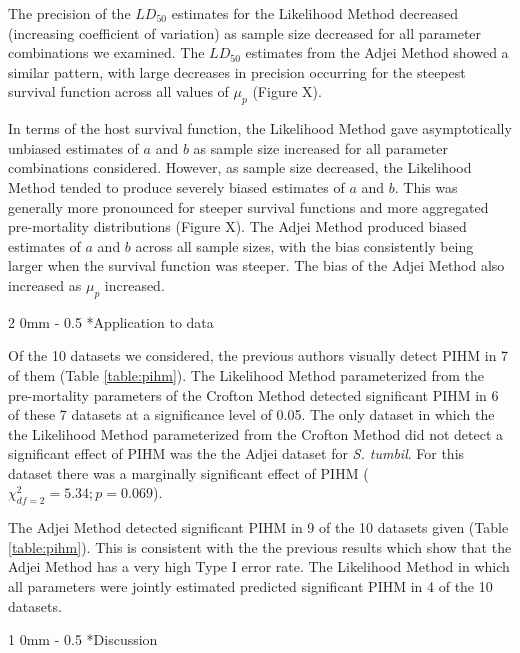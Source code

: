 \documentclass[12pt, a4paper]{article}
\makeatletter
\renewcommand{\section}{\@startsection
{section}%
{1}%
{0mm}%
{-\baselineskip}%
{0.5\baselineskip}%
{\normalfont\bf\large}} %
\renewcommand{\subsection}{\@startsection
{subsection}%
{2}%
{0mm}%
{-\baselineskip}%
{0.5\baselineskip}%
{\normalfont\bf}} %
\makeatother
\begin{document}
The precision of the $LD_{50}$ estimates for the Likelihood Method decreased
(increasing coefficient of variation) as sample size decreased for all
parameter combinations we examined.  The $LD_{50}$ estimates from the Adjei
Method showed a similar pattern, with large decreases in precision occurring
for the steepest survival function across all values of $\mu_p$ (Figure X).

In terms of the host survival function, the Likelihood Method gave
asymptotically unbiased estimates of $a$ and $b$ as sample size increased for
all parameter combinations considered.  However, as sample size decreased, the
Likelihood Method tended to produce severely biased estimates of $a$ and $b$.
This was generally more pronounced for steeper survival functions and more
aggregated pre-mortality distributions (Figure X).  The Adjei Method produced
biased estimates of $a$ and $b$ across all sample sizes, with the bias
consistently being larger when the survival function was steeper. The bias of
the Adjei Method also increased as $\mu_p$ increased.

\subsection*{Application to data}

Of the 10 datasets we considered, the previous authors visually detect PIHM
in 7 of them (Table \ref{table:pihm}).  The Likelihood Method parameterized
from the pre-mortality parameters of the Crofton Method detected significant
PIHM in 6 of these 7 datasets at a significance level of 0.05.  The only
dataset in which the the Likelihood Method parameterized from the Crofton
Method did not detect a significant effect of PIHM was the the Adjei dataset
for \emph{S. tumbil}.  For this dataset there was a marginally significant effect
of PIHM ($\chi^2_{df=2} = 5.34; p = 0.069$).

The Adjei Method detected significant PIHM in 9 of the 10 datasets given (Table \ref{table:pihm}).  This is consistent with the the previous results which show that the Adjei Method has a very high Type I error rate.  The Likelihood Method in which all parameters were jointly estimated predicted significant PIHM in 4 of the 10 datasets.

\section*{Discussion}
\end{document}
